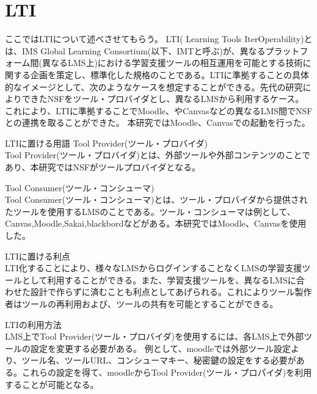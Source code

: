 \section{LTI}
\label{tag:LTI}


ここではLTIについて述べさせてもらう。
LTI(
Learning Tools IterOperability)とは、IMS Global Learning Consortium(以下、IMTと呼ぶ)が、異なるプラットフォーム間(異なるLMS上)における学習支援ツールの相互運用を可能とする技術に関する企画を策定し、標準化した規格のことである。LTIに準拠することの具体的なイメージとして、次のようなケースを想定することができる。先代の研究によりできたNSFをツール・プロバイダとし、異なるLMSから利用するケース。
これにより、LTIに準拠することでMoodle、やCanvasなどの異なるLMS間でNSFとの連携を取ることができた。
本研究ではMoodle、Canvasでの起動を行った。

LTIに置ける用語
Tool Provider(ツール・プロバイダ)\\
Tool Provider(ツール・プロバイダ)とは、外部ツールや外部コンテンツのことであり、本研究ではNSFがツールプロバイダとなる。

Tool Consumer(ツール・コンシューマ)\\
Tool Consumer(ツール・コンシューマ)とは、ツール・プロバイダから提供されたツールを使用するLMSのことである。ツール・コンシューマは例として、Canvas,Moodle,Sakai,blackbordなどがある。本研究ではMoodle、Canvasを使用した。

LTIに置ける利点\\
LTI化することにより、様々なLMSからログインすることなくLMSの学習支援ツールとして利用することができる。また、学習支援ツールを、異なるLMSに合わせた設計で作らずに済むことも利点としてあげられる。これによりツール製作者はツールの再利用および、ツールの共有を可能とすることができる。

LTIの利用方法\\

LMS上でTool Provider(ツール・プロバイダ)を使用するには、各LMS上で外部ツールの設定を変更する必要がある。
例として、moodleでは外部ツール設定より、ツール名、ツールURL、コンシューマキー、秘密鍵の設定をする必要がある。これらの設定を得て、moodleからTool Provider(ツール・プロパイダ)を利用することが可能となる。

